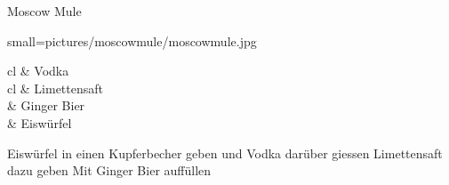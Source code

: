 \begin{recipe}
	[
	preparationtime = {\unit[5]{min}},
	bakingtime,
	bakingtemperature,
	portion = {\portion{1}},
	calory,
	source
	]
	{Moscow Mule}
	
	\graph
	{
		small=pictures/moscowmule/moscowmule.jpg
	}
	
	\ingredients
	{
		\unit[5]{cl} & Vodka \\
		\unit[2]{cl} & Limettensaft \\
	    & Ginger Bier \\
		& Eiswürfel \\
	}
	
	\preparation
	{
		\step Eiswürfel in einen Kupferbecher geben und Vodka darüber giessen
		\step Limettensaft dazu geben
		\step Mit Ginger Bier auffüllen
	}
\end{recipe}